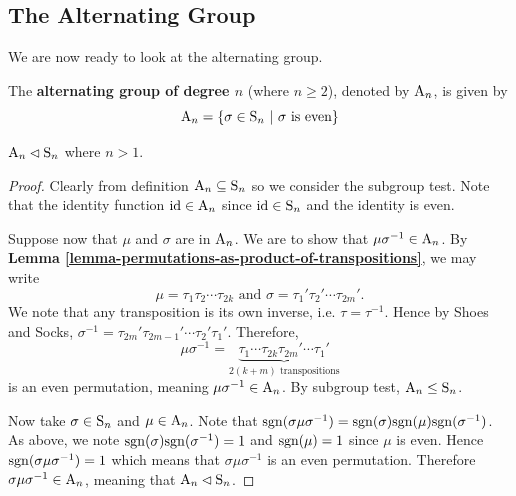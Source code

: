 \newpage

\subsection{The Alternating Group}
We are now ready to look at the alternating group.
\begin{definition}
    The \textbf{alternating group of degree $n$} (where $n \geq 2$), denoted by $\mathrm{A}_{n}$, is given by
    \[
        \mathrm{A}_{n} = \left\{\sigma \in \mathrm{S}_{n} \ | \ \sigma \text{ is even}\right\}
    \]
\end{definition}

\begin{proposition}
    $\mathrm{A}_{n} \lhd \mathrm{S}_{n}$ where $n > 1$.
\end{proposition}
\begin{proof}
    Clearly from definition $\mathrm{A}_{n} \subseteq \mathrm{S}_{n}$ so we consider the subgroup test. Note that the identity function $\mathrm{id} \in \mathrm{A}_{n}$ since $\mathrm{id} \in \mathrm{S}_{n}$ and the identity is even.

    Suppose now that $\mu$ and $\sigma$ are in $\mathrm{A}_{n}$. We are to show that $\mu\sigma^{-1} \in \mathrm{A}_{n}$. By \textbf{Lemma \ref{lemma-permutations-as-product-of-transpositions}}, we may write
    \[
        \mu = \tau_1\tau_2\cdots\tau_{2k} \text{ and } \sigma = \tau_1'\tau_2'\cdots\tau_{2m}'.
    \]
    We note that any transposition is its own inverse, i.e. $\tau = \tau^{-1}$. Hence by Shoes and Socks, $\sigma^{-1} = \tau_{2m}'\tau_{2m-1}'\cdots\tau_2'\tau_1'$. Therefore,
    \[
        \mu\sigma^{-1} = \underbrace{\tau_1\cdots\tau_{2k}\tau_{2m}'\cdots\tau_1'}_{2(k+m) \text{ transpositions}}
    \]
    is an even permutation, meaning $\mu\sigma^{-1} \in \mathrm{A}_{n}$. By subgroup test, $\mathrm{A}_{n} \leq \mathrm{S}_{n}$.
    
    Now take $\sigma \in \mathrm{S}_{n}$ and $\mu \in \mathrm{A}_{n}$. Note that $\mathrm{sgn}(\sigma\mu\sigma^{-1}) = \mathrm{sgn}(\sigma)\mathrm{sgn}(\mu)\mathrm{sgn}(\sigma^{-1})$. As above, we note $\mathrm{sgn}(\sigma)\mathrm{sgn}(\sigma^{-1}) = 1$ and $\mathrm{sgn}(\mu) = 1$ since $\mu$ is even. Hence $\mathrm{sgn}(\sigma\mu\sigma^{-1}) = 1$ which means that $\sigma\mu\sigma^{-1}$ is an even permutation. Therefore $\sigma\mu\sigma^{-1} \in \mathrm{A}_{n}$, meaning that $\mathrm{A}_{n} \lhd \mathrm{S}_{n}$.
\end{proof}

